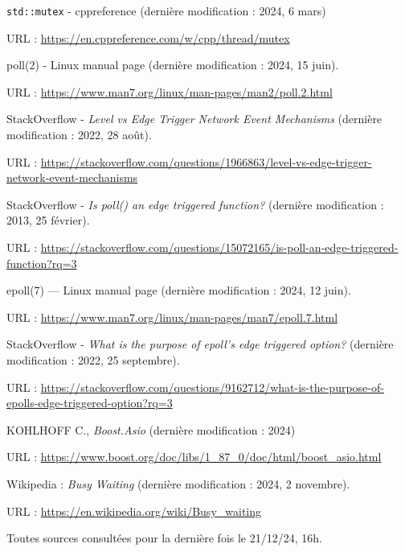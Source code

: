 \documentclass{article}
\begin{document}
\begin{thebibliography}{999}
    \texttt{std::mutex} - cppreference (dernière modification : 2024, 6 mars)

    URL : \url{https://en.cppreference.com/w/cpp/thread/mutex}

    poll(2) - Linux manual page (dernière modification : 2024, 15 juin).

    URL : \url{https://www.man7.org/linux/man-pages/man2/poll.2.html}


    StackOverflow - \textit{Level vs Edge Trigger Network Event Mechanisms} (dernière modification : 2022, 28 août).

    URL : \url{https://stackoverflow.com/questions/1966863/level-vs-edge-trigger-network-event-mechanisms}

    StackOverflow - \textit{Is poll() an edge triggered function?} (dernière modification : 2013, 25 février).

    URL : \url{https://stackoverflow.com/questions/15072165/is-poll-an-edge-triggered-function?rq=3}

    epoll(7) — Linux manual page (dernière modification : 2024, 12 juin).

    URL : \url{https://www.man7.org/linux/man-pages/man7/epoll.7.html}

    StackOverflow - \textit{What is the purpose of epoll's edge triggered option?} (dernière modification : 2022, 25 septembre).

    URL : \url{https://stackoverflow.com/questions/9162712/what-is-the-purpose-of-epolls-edge-triggered-option?rq=3}


    KOHLHOFF C., \textit{Boost.Asio} (dernière modification : 2024)

    URL : \url{https://www.boost.org/doc/libs/1_87_0/doc/html/boost_asio.html}

    Wikipedia : \textit{Busy Waiting} (dernière modification : 2024, 2 novembre).

    URL : \url{https://en.wikipedia.org/wiki/Busy_waiting}
\end{thebibliography}
Toutes sources consultées pour la dernière fois le 21/12/24, 16h.
\end{document}
